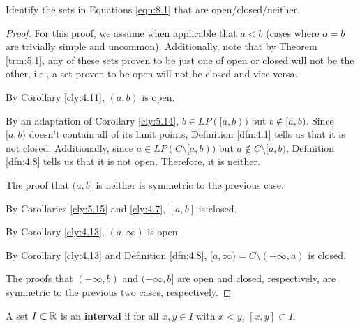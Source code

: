 \documentclass[../main.tex]{subfiles}
\begin{document}
\begin{exercise}\label{exr:8.1}
    Identify the sets in Equations \ref{eqn:8.1} that are open/closed/neither.
    \begin{proof}
        For this proof, we assume when applicable that $a<b$ (cases where $a=b$ are trivially simple and uncommon). Additionally, note that by Theorem \ref{trm:5.1}, any of these sets proven to be just one of open or closed will not be the other, i.e., a set proven to be open will not be closed and vice versa.\par\smallskip
        By Corollary \ref{cly:4.11}, $(a,b)$ is open.\par
        By an adaptation of Corollary \ref{cly:5.14}, $b\in LP([a,b))$ but $b\notin[a,b)$. Since $[a,b)$ doesn't contain all of its limit points, Definition \ref{dfn:4.1} tells us that it is not closed. Additionally, since $a\in LP(C\setminus[a,b))$ but $a\notin C\setminus[a,b)$, Definition \ref{dfn:4.8} tells us that it is not open. Therefore, it is neither.\par
        The proof that $(a,b]$ is neither is symmetric to the previous case.\par
        By Corollaries \ref{cly:5.15} and \ref{cly:4.7}, $[a,b]$ is closed.\par
        By Corollary \ref{cly:4.13}, $(a,\infty)$ is open.\par
        By Corollary \ref{cly:4.13} and Definition \ref{dfn:4.8}, $[a,\infty)=C\setminus(-\infty,a)$ is closed.\par
        The proofs that $(-\infty,b)$ and $(-\infty,b]$ are open and closed, respectively, are symmetric to the previous two cases, respectively.
    \end{proof}
\end{exercise}

\begin{definition}\label{dfn:8.2}
    A set $I\subset\mathbb{R}$ is an \textbf{interval} if for all $x,y\in I$ with $x<y$, $[x,y]\subset I$.
\end{definition}
\pagebreak
\end{document}
